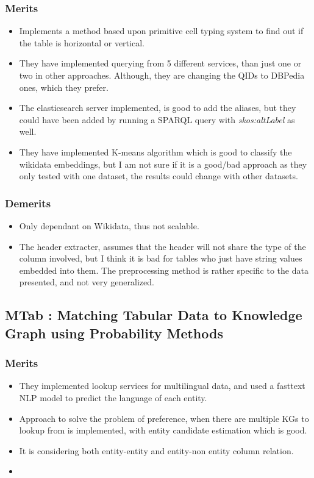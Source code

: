 \documentclass[runningheads]{llncs}
\begin{document}
\subsubsection*{Merits}
\begin{itemize}
    \item Implements a method based upon primitive cell typing system to find out if the table is horizontal or vertical.
    \item They have implemented querying from 5 different services, than just one or two in other approaches. Although, they are changing the QIDs to DBPedia ones, which they prefer. 
    \item The elasticsearch server implemented, is good to add the aliases, but they could have been added by running a SPARQL query with \textit{skos:altLabel} as well.
    \item They have implemented K-means algorithm which is good to classify the wikidata embeddings, but I am not sure if it is a good/bad approach as they only tested with one dataset, the results could change with other datasets. 
\end{itemize}
\subsubsection*{Demerits}
\begin{itemize}
    \item Only dependant on Wikidata, thus not scalable.
    \item The header extracter, assumes that the header will not share the type of the column involved, but I think it is bad for tables who just have string values embedded into them. The preprocessing method is rather specific to the data presented, and not very generalized.
\end{itemize}
\subsection{MTab : Matching Tabular Data to Knowledge Graph using Probability Methods}
\subsubsection*{Merits}
\begin{itemize}
    \item They implemented lookup services for multilingual data, and used a fasttext NLP model to predict the language of each entity.
    \item Approach to solve the problem of preference, when there are multiple KGs to lookup from is implemented, with entity candidate estimation which is good.
    \item It is considering both entity-entity and entity-non entity column relation.
    \item 
\end{itemize}
\end{document}
